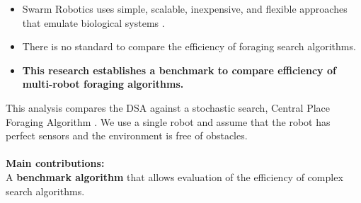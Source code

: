 \documentclass[a0paper,portrait]{baposter}
\begin{document}
\begin{poster}
{\begin{itemize}
\item Swarm Robotics uses simple, scalable, inexpensive, and flexible approaches that emulate biological systems \cite{NasaSwarmathon}.
\item There is no standard to compare the efficiency of foraging search algorithms. 
\item \textbf{This research establishes a benchmark to compare efficiency of multi-robot foraging algorithms.}
\end{itemize}
This analysis compares the DSA against a stochastic search, Central Place Foraging Algorithm \cite{Hecker&Moses15Beyond}. We use a single robot and assume that the robot has perfect sensors and the environment is free of obstacles.\\ 
\\\textbf{Main contributions:}\\
A \textbf{benchmark algorithm} that allows evaluation of the efficiency of complex search algorithms.
}







\end{poster}
\end{document}
